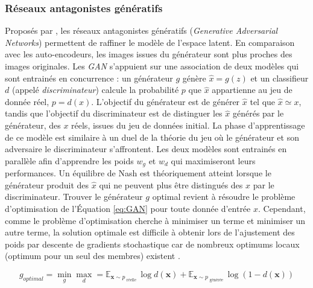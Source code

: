 


\subsubsection{Réseaux antagonistes génératifs} \label{subsubsec:GAN}
Proposés par \cite{goodfellow_generative_2014}, les réseaux antagonistes génératifs (\textit{Generative Adversarial Networks}) permettent de raffiner le modèle de l'espace latent.
En comparaison avec les auto-encodeurs, les images issues du générateur sont plus proches des images originales.
Les \textit{GAN} s'appuient sur une association de deux modèles qui sont entrainés en concurrence : un générateur $g$ génère $\hat x = g(z)$ et un classifieur $d$ (appelé \textit{discriminateur}) calcule la probabilité $p$ que $\hat x$ appartienne au jeu de donnée réel, $p = d(x)$.
L'objectif du générateur est de générer $\hat x$ tel que $\hat x \simeq x$, tandis que l'objectif du discriminateur est de distinguer les $\hat x$ générés par le générateur, des $x$ réels, issues du jeu de données initial.
La phase d'apprentissage de ce modèle est similaire à un duel de la théorie du jeu où le générateur et son adversaire le discriminateur s'affrontent.
Les deux modèles sont entrainés en parallèle afin d'apprendre les poids $w_g$ et $w_d$ qui maximiseront leurs performances.
Un équilibre de Nash \cite{nash_equilibrium_1950, nash_noncooperative_1951} est théoriquement atteint lorsque le générateur produit des $\hat x$ qui ne peuvent plus être distingués des $x$ par le discriminateur.
Trouver le générateur $g$ optimal revient à résoudre le problème d'optimisation de l'Équation \ref{eq:GAN} pour toute donnée d'entrée $x$.
Cependant, comme le problème d'optimisation cherche à minimiser un terme et minimiser un autre terme, la solution optimale est difficile à obtenir lors de l'ajustement des poids par descente de gradients stochastique car de nombreux optimums locaux (optimum pour un seul des membres) existent \cite{goodfellow_generative_2014}.

\begin{equation} \label{eq:GAN}
g_{optimal}  = \min _{g} \max _{d} = \mathbb{E}_{\mathbf{x} \sim p_{\text { réelle }}} \log d(\boldsymbol{x})+\mathbb{E}_{\boldsymbol{x} \sim p_{\text { générée }}} \log (1-d(\boldsymbol{x}))
\end{equation}

